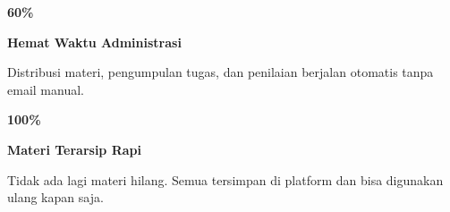 \documentclass[a4paper]{article}
\begin{document}
\noindent
\begin{minipage}[t]{0.485\textwidth}
    \noindent\colorbox{BlueBg}{%
        \begin{minipage}[t]{\dimexpr\linewidth-2\fboxsep}
            \vspace{6pt}
            {\fontsize{20}{24}\selectfont\bfseries\color{VioletPrimary} 60\%}\par\vspace{2pt}
            {\fontsize{9.5}{12}\selectfont\bfseries\color{BlueDark} Hemat Waktu Administrasi}\par\vspace{2pt}
            {\fontsize{8.5}{11}\selectfont\color{TextDark}Distribusi materi, pengumpulan tugas, dan penilaian berjalan otomatis tanpa email manual.}%
            \vspace{6pt}
        \end{minipage}}%
    \vspace{6pt}
    \noindent\colorbox{BlueBg}{%
        \begin{minipage}[t]{\dimexpr\linewidth-2\fboxsep}
            \vspace{6pt}
            {\fontsize{20}{24}\selectfont\bfseries\color{VioletPrimary} 100\%}\par\vspace{2pt}
            {\fontsize{9.5}{12}\selectfont\bfseries\color{BlueDark} Materi Terarsip Rapi}\par\vspace{2pt}
            {\fontsize{8.5}{11}\selectfont\color{TextDark}Tidak ada lagi materi hilang. Semua tersimpan di platform dan bisa digunakan ulang kapan saja.}%
            \vspace{6pt}
        \end{minipage}}%
\end{minipage}%
\hfill
\end{document}
